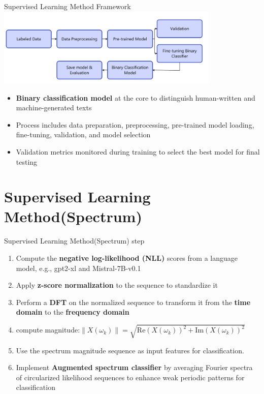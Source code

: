 \documentclass[serif]{beamer}
\begin{document}
\begin{frame}{Supervised Learning Method Framework}
\centering
\includegraphics[width=0.8\textwidth]{images/sup method.jpg}

\vspace{0.5cm}

\small{
\begin{itemize}
    \item \textbf{Binary classification model} at the core to distinguish human-written and machine-generated texts
    \item Process includes data preparation, preprocessing, pre-trained model loading, fine-tuning, validation, and model selection
    \item Validation metrics monitored during training to select the best model for final testing
\end{itemize}
}
\end{frame}

\section{Supervised Learning Method(Spectrum)}
\begin{frame}{Supervised Learning Method(Spectrum) step}
\centering
\begin{enumerate}
  \item Compute the \textbf{negative log-likelihood (NLL)} scores from a language model, e.g., gpt2-xl and Mistral-7B-v0.1
  \item Apply \textbf{z-score normalization} to the sequence to standardize it
  \item Perform a \textbf{DFT} on the normalized sequence to transform it from the \textbf{time domain} to the \textbf{frequency domain}
  \item compute magnitude:$\|X(\omega_k)\| = \sqrt{\text{Re}(X(\omega_k))^2 + \text{Im}(X(\omega_k))^2}$
  \item Use the spectrum magnitude sequence as input features for classification.
  \item Implement \textbf{Augmented spectrum classifier} by averaging Fourier spectra of circularized likelihood sequences to enhance weak periodic patterns for classification
\end{enumerate}
\end{frame}
\end{document}
